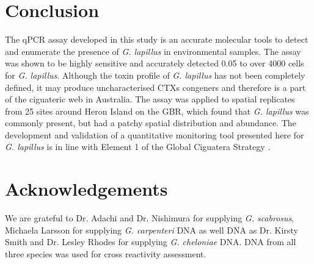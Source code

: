 \documentclass[12pt]{article}
\begin{document}
\section*{Conclusion}
The qPCR assay developed in this study is an accurate molecular tools to detect and enumerate the presence of \emph{G. lapillus} %
in environmental samples. 
The assay was shown to be highly sensitive and accurately detected 0.05 to over 4000 cells for \emph{G. lapillus}. %
Although the toxin profile of \emph{G. lapillus} has not been completely defined, it may produce uncharacterised CTXs congeners \cite{kretzschmar2017characterization,larsson2018toxicology} and therefore is a part of the ciguateric web in Australia.
The assay was applied to spatial replicates from 25 sites around Heron Island on the GBR, which found that \textit{G. lapillus} was commonly present, but had a patchy spatial distribution and abundance. 
The development and validation of a quantitative monitoring tool presented here for \textit{G. lapillus} is in line with Element 1 of the Global Ciguatera Strategy \cite{globalcig}.

 \section*{Acknowledgements}
We are grateful to Dr. Adachi and Dr. Nishimura for supplying \emph{G. scabrosus}, Michaela Larsson for supplying \emph{G. carpenteri} DNA as well DNA as Dr. Kirsty Smith and Dr. Lesley Rhodes for supplying \emph{G. cheloniae} DNA. 
DNA from all three species was used for cross reactivity assessment. 



\FloatBarrier
\newpage
%
%


\end{document}
